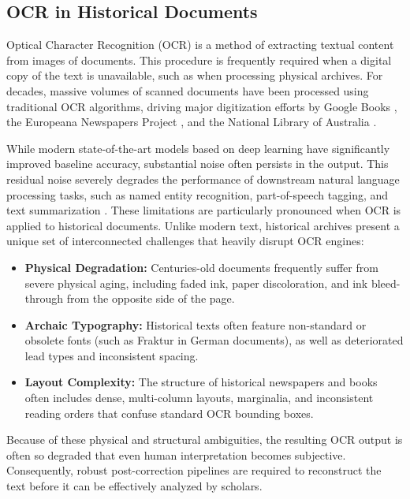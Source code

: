 \documentclass[11pt]{extarticle}
\begin{document}
\subsection{OCR in Historical Documents}
Optical Character Recognition (OCR) is a method of extracting textual content from images of documents. This procedure is frequently required when a digital copy of the text is unavailable, such as when processing physical archives. For decades, massive volumes of scanned documents have been processed using traditional OCR algorithms, driving major digitization efforts by Google Books \cite{leetaru_2008}, the Europeana Newspapers Project \cite{neudecker_2016}, and the National Library of Australia \cite{holley_2009}. 

While modern state-of-the-art models based on deep learning have significantly improved baseline accuracy, substantial noise often persists in the output. This residual noise severely degrades the performance of downstream natural language processing tasks, such as named entity recognition, part-of-speech tagging, and text summarization \cite{10.1007/978-3-030-64452-9_3,vanStrien2020AssessingTI}. These limitations are particularly pronounced when OCR is applied to historical documents. Unlike modern text, historical archives present a unique set of interconnected challenges that heavily disrupt OCR engines:
\begin{itemize}
    \item \textbf{Physical Degradation:} Centuries-old documents frequently suffer from severe physical aging, including faded ink, paper discoloration, and ink bleed-through from the opposite side of the page.
    \item \textbf{Archaic Typography:} Historical texts often feature non-standard or obsolete fonts (such as Fraktur in German documents), as well as deteriorated lead types and inconsistent spacing.
    \item \textbf{Layout Complexity:} The structure of historical newspapers and books often includes dense, multi-column layouts, marginalia, and inconsistent reading orders that confuse standard OCR bounding boxes.
\end{itemize}

Because of these physical and structural ambiguities, the resulting OCR output is often so degraded that even human interpretation becomes subjective. Consequently, robust post-correction pipelines are required to reconstruct the text before it can be effectively analyzed by scholars.
\end{document}
